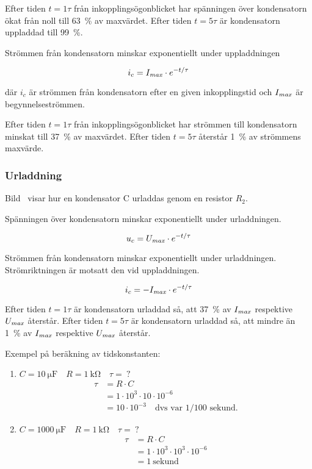 Efter tiden \(t = 1\tau\) från inkopplingsögonblicket har spänningen över
kondensatorn ökat från noll till 63~\% av maxvärdet.
Efter tiden \(t = 5\tau\) är kondensatorn uppladdad till 99~\%.

Strömmen från kondensatorn minskar exponentiellt under uppladdningen

\[i_c = I_{\it max} \cdot e^{-t/\tau}\]

där
\(i_c\) är strömmen från kondensatorn efter en given inkopplingstid och 
\(I_{\it max}\) är begynnelseströmmen.

Efter tiden \(t = 1\tau\) från inkopplingsögonblicket har strömmen till
kondensatorn minskat till 37~\% av maxvärdet.
Efter tiden \(t = 5\tau\) återstår 1~\% av strömmens maxvärde.

\subsubsection{Urladdning}


Bild~ visar hur en kondensator C urladdas genom en
resistor \(R_2\).

Spänningen över kondensatorn minskar exponentiellt under urladdningen.

\[u_c = U_{\it max} \cdot e^{-t/\tau}\]

Strömmen från kondensatorn minskar exponentiellt under urladdningen.
Strömriktningen är motsatt den vid uppladdningen.

\[i_c = - I_{\it max} \cdot e^{-t/\tau}\]

Efter tiden \(t = 1\tau\) är kondensatorn urladdad så, att 37~\% av
\(I_{\it max}\) respektive \(U_{\it max}\) återstår.
Efter tiden \(t = 5\tau\) är kondensatorn urladdad så, att mindre än 1~\% av
\(I_{\it max}\) respektive \(U_{\it max}\) återstår.

Exempel på beräkning av tidskonstanten:
\begin{enumerate}
\item \(C = \qty{10}{\micro\farad} \quad R = \qty{1}{\kilo\ohm} \quad \tau =\ ?\)
  \begin{align*}
    \tau &= R \cdot C \\
    &= 1 \cdot 10^3 \cdot 10 \cdot 10^{-6} \\
    &= 10 \cdot 10^{-3} \quad \text{dvs var 1/100 sekund.}
  \end{align*}
\item \(C = \qty{1000}{\micro\farad} \quad R = \qty{1}{\kilo\ohm} \quad \tau =\ ?\)
  \begin{align*}
    \tau &= R \cdot C \\
    &= 1 \cdot 10^3 \cdot 10^3 \cdot 10^{-6} \\
    &= 1\ \text{sekund}
  \end{align*}
\end{enumerate}

